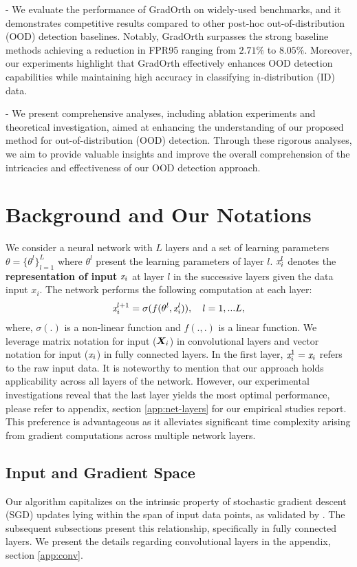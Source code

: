 \documentclass{article}
\begin{document}
\quad- We evaluate the performance of GradOrth on widely-used benchmarks, and it demonstrates competitive results compared to other post-hoc out-of-distribution (OOD) detection baselines. Notably, GradOrth surpasses the strong baseline methods achieving a reduction in FPR95 ranging from $2.71\%$ to $8.05\%$. Moreover, our experiments highlight that GradOrth effectively enhances OOD detection capabilities while maintaining high accuracy in classifying in-distribution (ID) data.

\quad- We present comprehensive analyses, including ablation experiments and theoretical investigation, aimed at enhancing the understanding of our proposed method for out-of-distribution (OOD) detection. Through these rigorous analyses, we aim to provide valuable insights and improve the overall comprehension of the intricacies and effectiveness of our OOD detection approach.

\section{Background and Our Notations}\vspace{-0.2cm} 
We consider a neural network with $L$ layers and a set of learning parameters $\theta=\{\theta^l\}_{l=1}^L$ where $\theta^l$ present the learning parameters of layer $l$. $\emph{x}_{i}^{l}$ denotes the \textbf{representation of input} $\emph{x}_{i}$ at layer $l$ in the successive layers given the data input $x_i$. The network performs the following computation at each layer:
\begin{align}
    \emph{x}_{i}^{l+1} = \sigma(f(\theta^l,\emph{x}_{i}^{l})), \quad l=1,...L, 
\end{align}
where, $\sigma(.)$ is a non-linear function and $f(. , .)$ is a linear function.   We leverage matrix notation for input (${\bm{X}}_{i}$) in convolutional layers and vector notation for input ($\emph{x}_{i}$) in fully connected layers. In the first layer, $\emph{x}_{i}^{1}=\emph{x}_{i}$ refers to the raw input data. It is noteworthy to mention that our approach holds applicability across all layers of the network. However, our experimental investigations reveal that the last layer yields the most optimal performance, please refer to appendix, section \ref{app:net-layers} for our empirical studies report. This preference is advantageous as it alleviates significant time complexity arising from gradient computations across multiple network layers.



\subsection{Input and Gradient Space}\vspace{-3mm}
 Our algorithm capitalizes on the intrinsic property of stochastic gradient descent (SGD) updates lying within the span of input data points, as validated by \cite{zhang2021understanding,hu2021lora,yang2021generalized}. The subsequent subsections present this relationship, specifically in fully connected layers. We present the details regarding convolutional layers in the appendix, section \ref{app:conv}.  
\end{document}
